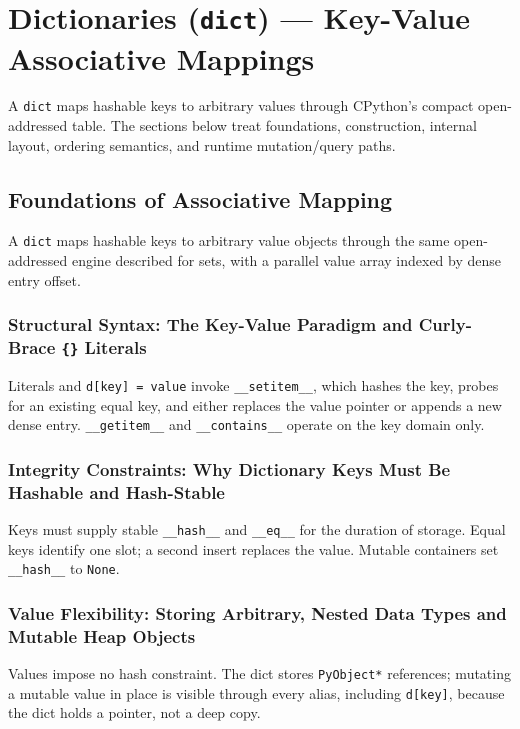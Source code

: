 \documentclass[a4paper,twoside]{report}
\begin{document}
\section{Dictionaries (\texttt{dict}) --- Key-Value Associative Mappings}

A \texttt{dict} maps hashable keys to arbitrary values through CPython's compact open-addressed table. The sections below treat foundations, construction, internal layout, ordering semantics, and runtime mutation/query paths.


\subsection{Foundations of Associative Mapping}

A \texttt{dict} maps hashable keys to arbitrary value objects through the same open-addressed engine described for sets, with a parallel value array indexed by dense entry offset.

\subsubsection{Structural Syntax: The Key-Value Paradigm and Curly-Brace \texttt{\{\}} Literals}

Literals and \texttt{d[key] = value} invoke \texttt{\_\_setitem\_\_}, which hashes the key, probes for an existing equal key, and either replaces the value pointer or appends a new dense entry. \texttt{\_\_getitem\_\_} and \texttt{\_\_contains\_\_} operate on the key domain only.

\subsubsection{Integrity Constraints: Why Dictionary Keys Must Be Hashable and Hash-Stable}

Keys must supply stable \texttt{\_\_hash\_\_} and \texttt{\_\_eq\_\_} for the duration of storage. Equal keys identify one slot; a second insert replaces the value. Mutable containers set \texttt{\_\_hash\_\_} to \texttt{None}.

\subsubsection{Value Flexibility: Storing Arbitrary, Nested Data Types and Mutable Heap Objects}

Values impose no hash constraint. The dict stores \texttt{PyObject*} references; mutating a mutable value in place is visible through every alias, including \texttt{d[key]}, because the dict holds a pointer, not a deep copy.
\end{document}

